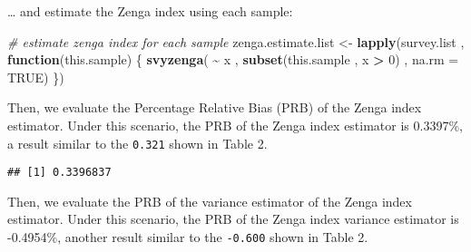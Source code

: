 \documentclass[
]{book}
\newenvironment{Shaded}{\begin{snugshade}}{\end{snugshade}}
\newcommand{\AttributeTok}[1]{\textcolor[rgb]{0.13,0.29,0.53}{#1}}
\newcommand{\CommentTok}[1]{\textcolor[rgb]{0.56,0.35,0.01}{\textit{#1}}}
\newcommand{\ConstantTok}[1]{\textcolor[rgb]{0.56,0.35,0.01}{#1}}
\newcommand{\ControlFlowTok}[1]{\textcolor[rgb]{0.13,0.29,0.53}{\textbf{#1}}}
\newcommand{\DecValTok}[1]{\textcolor[rgb]{0.00,0.00,0.81}{#1}}
\newcommand{\FunctionTok}[1]{\textcolor[rgb]{0.13,0.29,0.53}{\textbf{#1}}}
\newcommand{\NormalTok}[1]{#1}
\newcommand{\OtherTok}[1]{\textcolor[rgb]{0.56,0.35,0.01}{#1}}
\newcommand{\SpecialCharTok}[1]{\textcolor[rgb]{0.81,0.36,0.00}{\textbf{#1}}}
\begin{document}
\ldots{} and estimate the Zenga index using each sample:

\begin{Shaded}
\begin{Highlighting}[]
\CommentTok{\# estimate zenga index for each sample}
\NormalTok{zenga.estimate.list }\OtherTok{\textless{}{-}}
  \FunctionTok{lapply}\NormalTok{(survey.list ,}
         \ControlFlowTok{function}\NormalTok{(this.sample) \{}
           \FunctionTok{svyzenga}\NormalTok{( }\SpecialCharTok{\textasciitilde{}}\NormalTok{ x ,}
                     \FunctionTok{subset}\NormalTok{(this.sample , x }\SpecialCharTok{\textgreater{}} \DecValTok{0}\NormalTok{) ,}
                     \AttributeTok{na.rm =} \ConstantTok{TRUE}\NormalTok{)}
\NormalTok{         \})}
\end{Highlighting}
\end{Shaded}

Then, we evaluate the Percentage Relative Bias (PRB) of the Zenga index estimator. Under this scenario, the PRB of the Zenga index estimator is 0.3397\%, a result similar to the \texttt{0.321} shown in Table 2.

\begin{Shaded}
\end{Shaded}

\begin{verbatim}
## [1] 0.3396837
\end{verbatim}

Then, we evaluate the PRB of the variance estimator of the Zenga index estimator. Under this scenario, the PRB of the Zenga index variance estimator is -0.4954\%, another result similar to the \texttt{-0.600} shown in Table 2.
\end{document}
